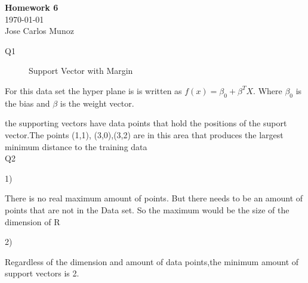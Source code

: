 \documentclass[12pt,english]{article}
\begin{document}
\begin{center}
    \Large
    \textbf{Homework 6}\\
    \small
    \today\\
    \large
    Jose Carlos Munoz
\end{center}%
Q1\\
\begin{figure}[h]
\centering
{}
\caption{Support Vector with Margin} \label{fig:M1}
\end{figure}\par
For this data set the hyper plane is  is written as $f(x) =\beta_0 +\beta^{T}X$. Where $\beta_0$ is the bias and $\beta$ is the weight vector.\par
the supporting vectors have data points that hold the positions of the suport vector.The points (1,1), (3,0),(3,2)  are in this area that produces the largest minimum distance to the training data \\
Q2\par
1)\par
There is no real maximum amount of points. But there needs to be an amount of points that are not in the Data set. So the maximum would be the size of the dimension of R\par
\par
2)\par
Regardless of the dimension and amount of data points,the minimum amount of support vectors is 2.
\end{document}
